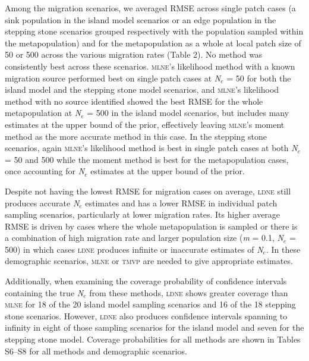 Among the migration scenarios, we averaged RMSE across single patch cases (a sink population in 
the island model scenarios or an edge population in the stepping stone scenarios grouped respectively 
with the population sampled within the metapopulation) and for the metapopulation as a whole at local 
patch size of 50 or 500 across the various migration rates (Table 2). No method was consistently 
best across these scenarios. \textsc{mlne}'s likelihood method with a known migration source performed 
best on single patch cases at \emph{N}$_e$ = 50 for both the island model and the
stepping stone model scenarios, and \textsc{mlne}'s likelihood method with no source identified 
showed the best RMSE for the whole metapopulation at \emph{N}$_e$ = 500 in the island model 
scenarios, but includes many estimates at the upper bound of the prior, effectively leaving 
\textsc{mlne}'s moment method as the more accurate method in this case. In the stepping stone scenarios, 
again \textsc{mlne}'s likelihood method is best in single patch cases at both \emph{N}$_e$ = 50 and 500 
while the moment method is best for the metapopulation cases, once accounting for \emph{N}$_e$ estimates 
at the upper bound of the prior.

Despite not having the lowest RMSE for migration cases on average, \textsc{ldne} still produces 
accurate \emph{N}$_e$ estimates and has a lower RMSE in individual patch sampling scenarios, particularly 
at lower migration rates. Its higher average RMSE is driven by cases where the whole metapopulation is 
sampled or there is a combination of high migration rate and larger population size (\emph{m} = 0.1, \emph{N}$_e$ = 500) 
in which cases \textsc{ldne} produces infinite or inaccurate estimates of \emph{N}$_e$. In these demographic 
scenarios, \textsc{mlne} or \textsc{tmvp} are needed to give appropriate estimates.

Additionally, when examining the coverage probability of confidence intervals containing the true 
\emph{N}$_e$ from these methods, \textsc{ldne} shows greater coverage than \textsc{mlne} for 18 of the 20 
island model sampling scenarios and 16 of the 18 stepping stone scenarios. However, \textsc{ldne} also 
produces confidence intervals spanning to infinity in eight of those sampling scenarios for the island 
model and seven for the stepping stone model. Coverage probabilities for all methods are shown in 
Tables S6--S8 for all methods and demographic scenarios.

